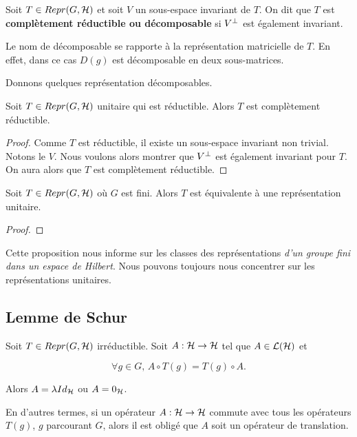 \begin{definition}
	Soit $T \in Repr(G, \mathcal{H})$ et soit $V$ un sous-espace invariant de
	$T$.
	On dit que $T$ est \textbf{complètement réductible ou décomposable} si
	$V^{\perp}$ est également invariant.
\end{definition}

Le nom de décomposable se rapporte à la représentation matricielle de $T$. En
effet, dans ce cas $D(g)$ est décomposable en deux sous-matrices.


Donnons quelques représentation décomposables.

\begin{proposition}
	Soit $T \in Repr(G, \mathcal{H})$ unitaire qui est réductible. Alors $T$
	est complètement réductible.
\end{proposition}

\ifdefined\outputproof
\begin{proof}
	Comme $T$ est réductible, il existe un sous-espace invariant non trivial.
	Notons le $V$.
	Nous voulons alors montrer que $V^{\perp}$ est également invariant pour
	$T$. On aura alors que $T$ est complètement réductible.
\end{proof}
\fi

\begin{proposition}
	Soit $T \in Repr(G, \mathcal{H})$ où $G$ est fini. Alors $T$ est équivalente à une
	représentation unitaire.
\end{proposition}

\ifdefined\outputproof
\begin{proof}

\end{proof}
\fi

Cette proposition nous informe sur les classes des représentations \textit{d'un groupe
fini dans un espace de Hilbert}. Nous pouvons toujours nous concentrer sur les
représentations unitaires.

\subsection{Lemme de Schur}

\begin{proposition} 
	\label{lemma:shur_lemma_1}
	Soit $T \in Repr(G, \mathcal{H})$ irréductible.
	Soit $A : \mathcal{H} \rightarrow \mathcal{H}$
	tel que $A \in \mathcal{L}(\mathcal{H})$ et

	\begin{equation}
		\forall g \in G, \, A \circ T(g) = T(g) \circ A.
	\end{equation}

	Alors $A = \lambda Id_{\mathcal{H}}$ ou $A = 0_{\mathcal{H}}$.

	En d'autres termes, si un opérateur $A : \mathcal{H} \rightarrow \mathcal{H}$
	commute avec tous les opérateurs $T(g)$, $g$ parcourant $G$, alors il est
	obligé que $A$ soit un opérateur de translation.
\end{proposition}

